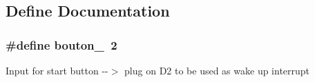 \subsection{Define Documentation}
\hypertarget{group__group2_ga8374105c04a302f629cb815b9ecce9d0}{
\subsubsection[{bouton\_\-1}]{\setlength{\rightskip}{0pt plus 5cm}\#define bouton\_~2}}
\label{group__group2_ga8374105c04a302f629cb815b9ecce9d0}
Input for start button -\/-\/$>$ plug on D2 to be used as wake up interrupt 
